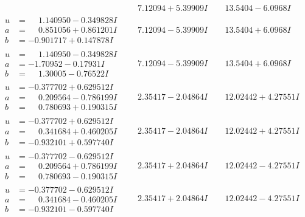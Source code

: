 \documentclass[1p]{elsarticle_modified}
\theoremstyle{definition}
\begin{document}
$$\begin{array}{c|c|c}
 & \phantom{-}7.12094 + 5.39909 I & \phantom{-}13.5404 - 6.0968 I \\ \hline\begin{aligned}
u &= \phantom{-}1.140950 - 0.349828 I \\
a &= \phantom{-}0.851056 + 0.861201 I \\
b &= -0.901717 + 0.147878 I\end{aligned}
 & \phantom{-}7.12094 - 5.39909 I & \phantom{-}13.5404 + 6.0968 I \\ \hline\begin{aligned}
u &= \phantom{-}1.140950 - 0.349828 I \\
a &= -1.70952 - 0.17931 I \\
b &= \phantom{-}1.30005 - 0.76522 I\end{aligned}
 & \phantom{-}7.12094 - 5.39909 I & \phantom{-}13.5404 + 6.0968 I \\ \hline\begin{aligned}
u &= -0.377702 + 0.629512 I \\
a &= \phantom{-}0.209564 - 0.786199 I \\
b &= \phantom{-}0.780693 + 0.190315 I\end{aligned}
 & \phantom{-}2.35417 - 2.04864 I & \phantom{-}12.02442 + 4.27551 I \\ \hline\begin{aligned}
u &= -0.377702 + 0.629512 I \\
a &= \phantom{-}0.341684 + 0.460205 I \\
b &= -0.932101 + 0.597740 I\end{aligned}
 & \phantom{-}2.35417 - 2.04864 I & \phantom{-}12.02442 + 4.27551 I \\ \hline\begin{aligned}
u &= -0.377702 - 0.629512 I \\
a &= \phantom{-}0.209564 + 0.786199 I \\
b &= \phantom{-}0.780693 - 0.190315 I\end{aligned}
 & \phantom{-}2.35417 + 2.04864 I & \phantom{-}12.02442 - 4.27551 I \\ \hline\begin{aligned}
u &= -0.377702 - 0.629512 I \\
a &= \phantom{-}0.341684 - 0.460205 I \\
b &= -0.932101 - 0.597740 I\end{aligned}
 & \phantom{-}2.35417 + 2.04864 I & \phantom{-}12.02442 - 4.27551 I \\ \hline\begin{aligned}

\end{aligned}
\end{array}$$
\end{document}
